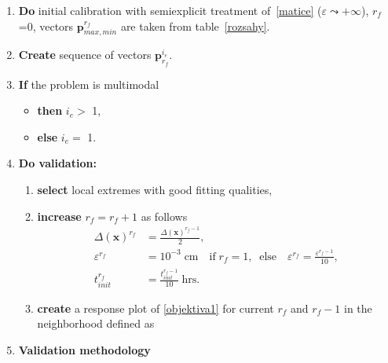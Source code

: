 \documentclass[review,times,3p,twocolumn,10pt]{elsarticle}
\renewcommand{\vec}{\mathbf}
\begin{document}
 \begin{enumerate}[label=({\bf \roman*})]
    \item {\bf Do} initial calibration with semiexplicit treatment of~\eqref{matice} ($\varepsilon \leadsto +\infty$), $r_f$=0,  vectors $\vec{p}_{max,min}^{r_f}$ are taken from table~\ref{rozsahy}. 
     \item {\bf Create}  sequence of vectors $\vec{p}^{i_e}_{r_f}$. 
     \item {\bf If} the problem is multimodal 
       \begin{itemize} 
           \item {\bf then} $i_e > $ 1, 
           \item {\bf else} $i_e = $ 1.
       \end{itemize} 
 \item {\bf Do validation:}  
    \begin{enumerate} 
      \item {\bf select} local extremes with good fitting qualities,
        \item {\bf increase} $r_f=r_f+1$ as follows 
                  \begin{equation}
                  \label{coeffs}
                  \begin{split}
                  \Delta(\vec{x})^{r_f}  &= \frac{\Delta(\vec{x})^{r_f-1}}{2}, \\
                  \varepsilon^{r_f} &= 10^{-3} \; \mbox{cm} \quad  \mbox{if} \; r_f = 1, \; \; \mbox{else} \quad \varepsilon^{r_f} = \frac{\varepsilon^{r_f-1}}{10}, \\
                  t_{init}^{r_f} &=  \frac{t_{init}^{r_f-1}}{10} \; \mbox{hrs} .
                  \end{split}
                  \end{equation}
        \item {\bf create} a response plot of \eqref{objektiva1} for current $r_f$ and $r_f-1$ in the neighborhood defined as 
     
\end{enumerate}

\item {\bf Validation methodology}

\end{enumerate}
\end{document}
